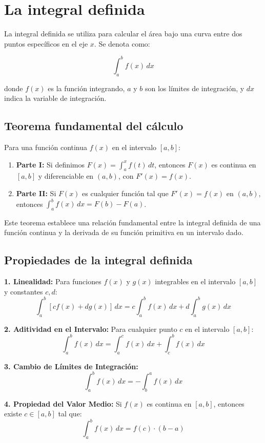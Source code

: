 \documentclass[12pt]{article}
\begin{document}
\section{La integral definida}
La integral definida se utiliza para calcular el área bajo una curva entre dos puntos específicos en el eje \( x \). Se denota como:

\[
\int_a^b f(x) \, dx
\]

donde \( f(x) \) es la función integrando, \( a \) y \( b \) son los límites de integración, y \( dx \) indica la variable de integración.

\subsection{Teorema fundamental del cálculo}

Para una función continua \( f(x) \) en el intervalo \( [a, b] \):

\begin{enumerate}
    \item \textbf{Parte I:} Si definimos \( F(x) = \int_a^x f(t) \, dt \), entonces \( F(x) \) es continua en \( [a, b] \) y diferenciable en \( (a, b) \), con \( F'(x) = f(x) \).
    
    \item \textbf{Parte II:} Si \( F(x) \) es cualquier función tal que \( F'(x) = f(x) \) en \( (a, b) \), entonces \( \int_a^b f(x) \, dx = F(b) - F(a) \).
\end{enumerate}

Este teorema establece una relación fundamental entre la integral definida de una función continua y la derivada de su función primitiva en un intervalo dado.
\subsection{Propiedades de la integral definida}

\textbf{1. Linealidad:} Para funciones \( f(x) \) y \( g(x) \) integrables en el intervalo \( [a, b] \) y constantes \( c, d \):
\[
\int_a^b [c f(x) + d g(x)] \, dx = c \int_a^b f(x) \, dx + d \int_a^b g(x) \, dx
\]

\textbf{2. Aditividad en el Intervalo:} Para cualquier punto \( c \) en el intervalo \( [a, b] \):
\[
\int_a^b f(x) \, dx = \int_a^c f(x) \, dx + \int_c^b f(x) \, dx
\]

\textbf{3. Cambio de Límites de Integración:}
\[
\int_a^b f(x) \, dx = -\int_b^a f(x) \, dx
\]

\textbf{4. Propiedad del Valor Medio:} Si \( f(x) \) es continua en \( [a, b] \), entonces existe \( c \in [a, b] \) tal que:
\[
\int_a^b f(x) \, dx = f(c) \cdot (b - a)
\]
\end{document}
